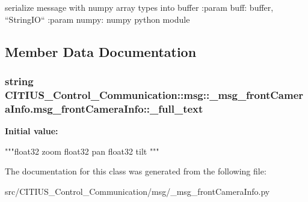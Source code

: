 \begin{DoxyVerb}
serialize message with numpy array types into buffer
:param buff: buffer, ``StringIO``
:param numpy: numpy python module
\end{DoxyVerb}
 

\subsection{\-Member \-Data \-Documentation}
\hypertarget{class_c_i_t_i_u_s___control___communication_1_1msg_1_1__msg__front_camera_info_1_1msg__front_camera_info_a4d7f15de816304471823a4fed7ef438e}{
\subsubsection[{\-\_\-full\-\_\-text}]{\setlength{\rightskip}{0pt plus 5cm}string \-C\-I\-T\-I\-U\-S\-\_\-\-Control\-\_\-\-Communication\-::msg\-::\-\_\-msg\-\_\-front\-Camera\-Info.\-msg\-\_\-front\-Camera\-Info\-::\-\_\-full\-\_\-text}}\label{class_c_i_t_i_u_s___control___communication_1_1msg_1_1__msg__front_camera_info_1_1msg__front_camera_info_a4d7f15de816304471823a4fed7ef438e}
{\bfseries \-Initial value\-:}
\begin{DoxyCode}
"""float32 zoom
float32 pan
float32 tilt
"""
\end{DoxyCode}


\-The documentation for this class was generated from the following file\-:\begin{DoxyCompactItemize}
\item 
src/\-C\-I\-T\-I\-U\-S\-\_\-\-Control\-\_\-\-Communication/msg/\-\_\-msg\-\_\-front\-Camera\-Info.\-py\end{DoxyCompactItemize}
